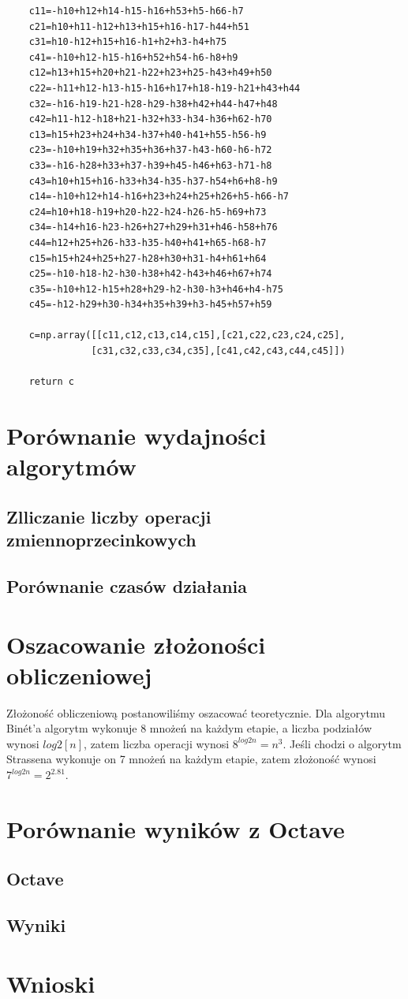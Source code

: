 \documentclass{article}
\begin{document}
\begin{verbatim}
    c11=-h10+h12+h14-h15-h16+h53+h5-h66-h7
    c21=h10+h11-h12+h13+h15+h16-h17-h44+h51
    c31=h10-h12+h15+h16-h1+h2+h3-h4+h75
    c41=-h10+h12-h15-h16+h52+h54-h6-h8+h9
    c12=h13+h15+h20+h21-h22+h23+h25-h43+h49+h50
    c22=-h11+h12-h13-h15-h16+h17+h18-h19-h21+h43+h44
    c32=-h16-h19-h21-h28-h29-h38+h42+h44-h47+h48
    c42=h11-h12-h18+h21-h32+h33-h34-h36+h62-h70
    c13=h15+h23+h24+h34-h37+h40-h41+h55-h56-h9
    c23=-h10+h19+h32+h35+h36+h37-h43-h60-h6-h72
    c33=-h16-h28+h33+h37-h39+h45-h46+h63-h71-h8
    c43=h10+h15+h16-h33+h34-h35-h37-h54+h6+h8-h9
    c14=-h10+h12+h14-h16+h23+h24+h25+h26+h5-h66-h7
    c24=h10+h18-h19+h20-h22-h24-h26-h5-h69+h73
    c34=-h14+h16-h23-h26+h27+h29+h31+h46-h58+h76
    c44=h12+h25+h26-h33-h35-h40+h41+h65-h68-h7
    c15=h15+h24+h25+h27-h28+h30+h31-h4+h61+h64
    c25=-h10-h18-h2-h30-h38+h42-h43+h46+h67+h74
    c35=-h10+h12-h15+h28+h29-h2-h30-h3+h46+h4-h75
    c45=-h12-h29+h30-h34+h35+h39+h3-h45+h57+h59

    c=np.array([[c11,c12,c13,c14,c15],[c21,c22,c23,c24,c25],
               [c31,c32,c33,c34,c35],[c41,c42,c43,c44,c45]])
    
    return c
\end{verbatim}

\section{Porównanie wydajności algorytmów}

\subsection{Zlliczanie liczby operacji zmiennoprzecinkowych}



\subsection{Porównanie czasów działania}

\section{Oszacowanie złożoności obliczeniowej}

Złożoność obliczeniową postanowiliśmy oszacować teoretycznie. Dla algorytmu Binét'a algorytm wykonuje 8 mnożeń na każdym etapie, a liczba podziałów wynosi \(log{2}[n]\), zatem liczba operacji wynosi \(8^{log{2}{n}} = n^3\). Jeśli chodzi o algorytm Strassena wykonuje on 7 mnożeń na każdym etapie, zatem złożoność wynosi \(7^{log{2}{n}} = 2^{2.81}\).

\section{Porównanie wyników z Octave}

\subsection{Octave}

\subsection{Wyniki}

\section{Wnioski}
\end{document}
